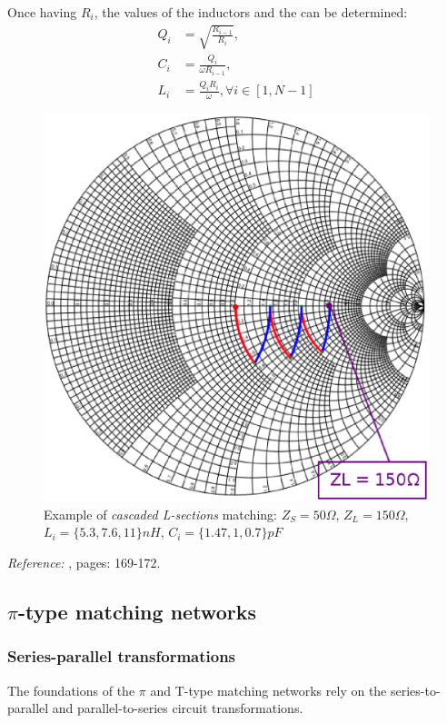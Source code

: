 \noindent Once having $R_i$, the values of the inductors and the can be determined:
\begin{align}
Q_i & = \sqrt {\frac{R_{i-1}}{R_i}},\\
C_i & = \frac{Q_i}{\omega R_{i-1}}, \\
L_i & = \frac{Q_i R_i}{\omega},  \forall i \in [1, N-1]
\end{align}


\begin{figure}[H]
\centering
\includegraphics[width=120mm]{SmithCascadedLCsections}
\caption{Example of \textit{cascaded L-sections} matching: $Z_S = 50\Omega$, $Z_L = 150\Omega$, $L_i = \lbrace 5.3, 7.6, 11\rbrace nH$, $C_i = \lbrace 1.47, 1, 0.7 \rbrace pF$}
\end{figure}


\noindent \textit{Reference:} \cite{BahlFundamentalsRFMW}, pages: 169-172.

\subsection{$\pi$-type matching networks}
\subsubsection{Series-parallel transformations}
The foundations of the $\pi$ and T-type matching networks rely on the series-to-parallel and parallel-to-series circuit transformations.

